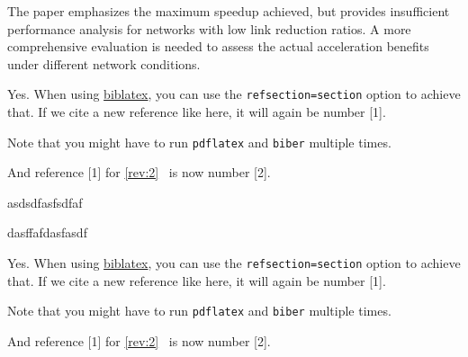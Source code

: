 \begin{revcomment}
	The paper emphasizes the maximum speedup achieved, but provides insufficient performance analysis for networks with low link reduction ratios. A more comprehensive evaluation is needed to assess the actual acceleration benefits under different network conditions.
\end{revcomment}
\begin{revresponse}
	Yes. When using \href{https://www.ctan.org/pkg/biblatex}{biblatex}, you can use the \texttt{refsection=section} option to achieve that.
	If we cite a new reference like \cite{Besser2021} here, it will again be number [1].

	Note that you might have to run \texttt{pdflatex} and \texttt{biber} multiple times.

	And reference [1] for \autoref{rev:2}~\cite{ReviewerReference} is now number [2].

\begin{changes}[III-A][4 left]
	\begin{add}
asdsdfasfsdfaf
\end{add}

\begin{remove}
dasffafdasfasdf
\end{remove}

Yes. When using \href{https://www.ctan.org/pkg/biblatex}{biblatex}, you can use the \texttt{refsection=section} option to achieve that.
	If we cite a new reference like \cite{Besser2021} here, it will again be number [1].

	Note that you might have to run \texttt{pdflatex} and \texttt{biber} multiple times.

	And reference [1] for \autoref{rev:2}~\cite{ReviewerReference} is now number [2].

\end{changes}
\end{revresponse}

